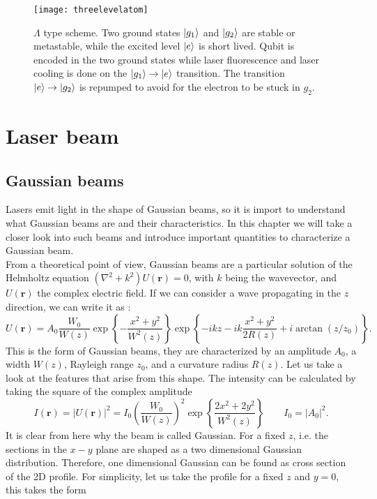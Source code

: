 \begin{figure}
\centering
\texttt{[image: threelevelatom]}
\caption{$\Lambda$ type scheme. Two ground states $\ket{g_1}$ and $\ket{g_2}$ are stable or metastable, while the excited level $\ket{e}$ is short lived. Qubit is encoded in the two ground states while laser fluorescence and laser cooling is done on the $\ket{g_1}\to \ket{e}$ transition. The transition $\ket{e}\to \ket{g_2}$ is repumped to avoid for the electron to be stuck in $g_2$.}
\label{threelevel}
\end{figure}
\section{Laser beam}
\subsection{Gaussian beams}
\label{sec_diffraction}
Lasers emit light in the shape of Gaussian beams, so it is import to understand what Gaussian beams are and their characteristics. In this chapter we will take a closer look into such beams and introduce important quantities to characterize a Gaussian beam. \\
From a theoretical point of view, Gaussian beams are a particular solution of the Helmholtz equation $(\nabla^2 + k^2)U(\mathbf{r}) = 0$, with $k$ being the wavevector, and $U(\mathbf{r})$ the complex electric field. If we can consider a wave propagating in the $z$ direction, we can write it as \cite{saleh}:
\begin{equation}
\label{gaussianbeams}
U(\mathbf{r}) = A_0 \frac{W_0}{W(z)}\exp\left\{-\frac{x^2+y^2}{W^2(z)}\right\}\exp\left\{-ikz-ik\frac{x^2+y^2}{2R(z)}+i\arctan(z/z_0)\right\}.
\end{equation}
This is the form of Gaussian beams, they are characterized by an amplitude $A_0$, a width $W(z)$, Rayleigh range $z_0$, and a curvature radius $R(z)$. Let us take a look at the features that arise from this shape. The intensity can be calculated by taking the square of the complex amplitude
\begin{equation}
\label{beamintensity}
I(\mathbf{r}) = |U(\mathbf{r})|^2 = I_0 \left(\frac{W_0}{W(z)}\right)^2 \exp\left\{\frac{2x^2 + 2y^2}{W^2(z)}\right\}  \qquad I_0 = |A_0|^2.
\end{equation}
It is clear from here why the beam is called Gaussian. For a fixed $z$, i.e. the sections in the $x-y$ plane are shaped as a two dimensional Gaussian distribution.
Therefore, one dimensional Gaussian can be found as cross section of the 2D profile. For simplicity, let us take the profile for a fixed $z$ and $y=0$, this takes the form
